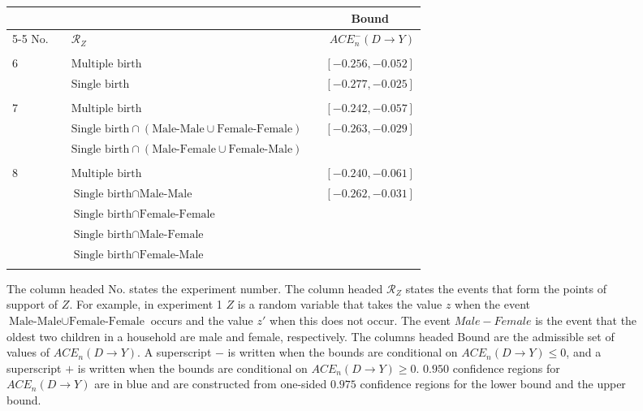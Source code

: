 \documentclass[10pt,a4paper,twoside]{article}
\newcommand{\details}{C:/Dropbox/TeXTemplates/}
\numberwithin{equation}{section}
\begin{document}
\begin{sidewaystable}[p]
\centering
\caption{$\mathcal{R}_Z$ and admissible sets of values of $ACE_n(D\rightarrow Y)$.}
\centering
\begin{subfigure}{\textwidth}
\centering
\begin{tabular}{lclcr}
\toprule
&	& & & \multicolumn{1}{c}{Bound} \\
\cmidrule(r){5-5}	
No.& &	$\mathcal{R}_Z$	&	&	$ACE_n^-(D\rightarrow Y)$\\
\midrule
& &\phantom{$\text{Male-Female}\cup\text{Female-Male}\cup\text{Female-Female}$}\\
6& &$\text{Multiple birth}$&	&	$[-0.256,-0.052]$\\
& &$\text{Single birth}$& &\color{blue}$[-0.277,-0.025]$	\\
\\
7& &$\text{Multiple birth}$&	&	$[-0.242,-0.057]$	\\
& &$\text{Single birth}\cap(\text{Male-Male}\cup\text{Female-Female})$& &\color{blue}$[-0.263,-0.029]$\\
& &$\text{Single birth}\cap(\text{Male-Female}\cup\text{Female-Male})$\\
\\
8& &$\text{Multiple birth}$&	&	$[-0.240,-0.061]$	\\
& &$\text{Single birth}\cap\text{Male-Male}$& &\color{blue}$[-0.262,-0.031]$	\\
& &$\text{Single birth}\cap\text{Female-Female}$\\
& &$\text{Single birth}\cap\text{Male-Female}$ \\
& &$\text{Single birth}\cap\text{Female-Male}$\\
	\\
\bottomrule
\end{tabular}
\vspace{10pt}
\caption{The column headed No. states the experiment number. The column headed $\mathcal{R}_Z$ states the events that form the points of support of $Z$. For example, in experiment 1 $Z$ is a random variable that takes the value $z$ when the event $\text{Male-Male}\cup\text{Female-Female}$ occurs and the value $z'$ when this does not occur. The event $Male-Female$ is the event that the oldest two children in a household are male and female, respectively. The columns headed Bound are the admissible set of values of $ACE_n(D\rightarrow Y)$. A superscript $-$ is written when the bounds are conditional on $ACE_n(D\rightarrow Y)\leq 0$, and a superscript $+$ is written when the bounds are conditional on $ACE_n(D\rightarrow Y)\geq 0$. $0.950$ confidence regions for $ACE_n(D\rightarrow Y)$ are in blue and are constructed from one-sided $0.975$ confidence regions for the lower bound and the upper bound.}
\end{subfigure}
\label{tbl:acemult}
\end{sidewaystable}
\newpage


\end{document}
